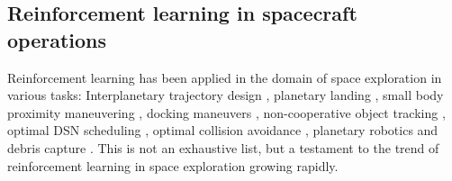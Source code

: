\subsection{Reinforcement learning in spacecraft operations}\label{ssec:rl-in-space}

Reinforcement learning has been applied in the domain of space exploration in various tasks: Interplanetary trajectory design \cite{Zavoli2020, Izzo2020, Li2020}, planetary landing \cite{Furfaro2020}, small body proximity maneuvering \cite{Willis2016, Nesnas2021}, docking maneuvers \cite{Oestreich2020}, non-cooperative object tracking \cite{Zhou2021}, optimal \gls{DSN} scheduling \cite{Goh2021}, optimal collision avoidance \cite{Gremyachikh2019}, planetary robotics \cite{Gankidi2017} and debris capture \cite{Zeng2022}. This is not an exhaustive list, but a testament to the trend of reinforcement learning in space exploration growing rapidly.